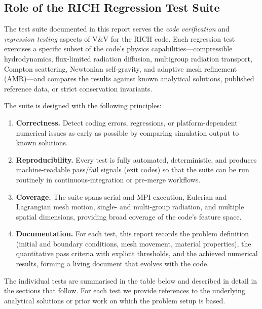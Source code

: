 \documentclass[11pt,a4paper]{article}
\begin{document}
\subsection{Role of the RICH Regression Test Suite}

The test suite documented in this report serves the \emph{code verification}
and \emph{regression testing} aspects of V\&V for the RICH code.  Each
regression test exercises a specific subset of the code's physics
capabilities---compressible hydrodynamics, flux-limited radiation diffusion,
multigroup radiation transport, Compton scattering, Newtonian self-gravity, and
adaptive mesh refinement (AMR)---and compares the results against known
analytical solutions, published reference data, or strict conservation
invariants.

The suite is designed with the following principles:

\begin{enumerate}
  \item \textbf{Correctness.}  Detect coding errors, regressions, or
    platform-dependent numerical issues as early as possible by comparing
    simulation output to known solutions.

  \item \textbf{Reproducibility.}  Every test is fully automated, deterministic,
    and produces machine-readable pass/fail signals (exit codes) so that the
    suite can be run routinely in continuous-integration or pre-merge workflows.

  \item \textbf{Coverage.}  The suite spans serial and MPI execution, Eulerian
    and Lagrangian mesh motion, single- and multi-group radiation, and multiple
    spatial dimensions, providing broad coverage of the code's feature space.

  \item \textbf{Documentation.}  For each test, this report records the problem
    definition (initial and boundary conditions, mesh movement, material
    properties), the quantitative pass criteria with explicit thresholds, and
    the achieved numerical results, forming a living document that evolves with
    the code.
\end{enumerate}

The individual tests are summarised in the table below and described in detail
in the sections that follow.  For each test we provide references to the
underlying analytical solutions or prior work on which the problem setup is
based.
\end{document}
